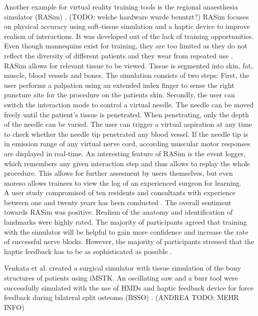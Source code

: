 Another example for virtual reality training tools is the regional anaesthesia simulator
(RASim) \cite{RN70}. (TODO: welche hardware wurde benutzt?) RASim focuses on physical accuracy using soft-tissue simulation and a haptic device to improve realism of interactions.
It was developed out of the lack of training opportunities. Even though mannequins exist
for training, they are too limited as they do not reflect the diversity of different patients
and they wear from repeated use \cite{RN70}.
\\ RASim allows for relevant tissue to be viewed. Tissue is segmented into skin, fat,
muscle, blood vessels and bones. The simulation consists of two steps: First, the user
performs a palpation using an extended index finger to sense the right puncture site for
the procedure on the patients skin. Secondly, the user can switch the interaction mode
to control a virtual needle. The needle can be moved freely until the patient’s tissue is
penetrated. When penetrating, only the depth of the needle can be varied. The user can
trigger a virtual aspiration at any time to check whether the needle tip penetrated any
blood vessel. If the needle tip is in emission range of any virtual nerve cord, according
muscular motor responses are displayed in real-time. An interesting feature of RASim is
the event logger, which remembers any given interaction step and thus allows to replay
the whole procedure. This allows for further assesment by users themselves, but even
moreso allows trainees to view the log of an experienced surgeon for learning.
\\ A user study compromised of ten residents and consultants with experience between one
and twenty years has been conducted \cite{RN72}. The overall sentiment towards RASim was
positive. Realism of the anatomy and identification of landmarks were highly rated. The
majority of participants agreed that training with the simulator will be helpful to gain
more confidence and increase the rate of successful nerve blocks. However, the majority
of participants stressed that the haptic feedback has to be as sophisticated as possible \cite{RN72}.

Venkata et al. created a surgical simulator with tissue simulation of the bony structures of patients using iMSTK.
An oscillating saw and a burr tool were successfully simulated with the use of HMDs and haptic feedback device for force feedback during bilateral split osteomo (BSSO) \cite{VenkataS.Arikatla.2018}.
(ANDREA TODO: MEHR INFO)

